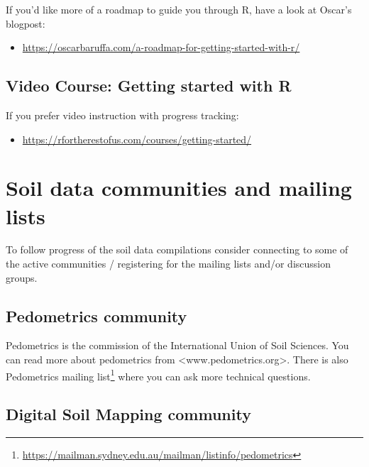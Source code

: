 \documentclass[
  graybox,natbib,nospthms]{svmono}
\providecommand{\tightlist}{%
  \setlength{\itemsep}{0pt}\setlength{\parskip}{0pt}}
\providecommand{\tightlist}{\setlength{\itemsep}{0pt}\setlength{\parskip}{0pt}}
\renewcommand{\href}[2]{#2 (\url{#1})}
\renewcommand{\href}[2]{#2\footnote{\url{#1}}}
\begin{document}
If you'd like more of a roadmap to guide you through R, have a look at Oscar's blogpost:

\begin{itemize}
\tightlist
\item
  \url{https://oscarbaruffa.com/a-roadmap-for-getting-started-with-r/}
\end{itemize}

\hypertarget{video-course-getting-started-with-r}{%
\section{Video Course: Getting started with R}\label{video-course-getting-started-with-r}}

If you prefer video instruction with progress tracking:

\begin{itemize}
\tightlist
\item
  \url{https://rfortherestofus.com/courses/getting-started/}
\end{itemize}

\hypertarget{soil-data-communities-and-mailing-lists}{%
\chapter{Soil data communities and mailing lists}\label{soil-data-communities-and-mailing-lists}}

To follow progress of the soil data compilations consider connecting to some of the
active communities / registering for the mailing lists and/or discussion groups.

\hypertarget{pedometrics-community}{%
\section{Pedometrics community}\label{pedometrics-community}}

Pedometrics is the commission of the International Union of Soil Sciences. You can
read more about pedometrics from \textless www.pedometrics.org\textgreater. There is also \href{https://mailman.sydney.edu.au/mailman/listinfo/pedometrics}{Pedometrics
mailing list} where you
can ask more technical questions.

\hypertarget{digital-soil-mapping-community}{%
\section{Digital Soil Mapping community}\label{digital-soil-mapping-community}}
\end{document}
